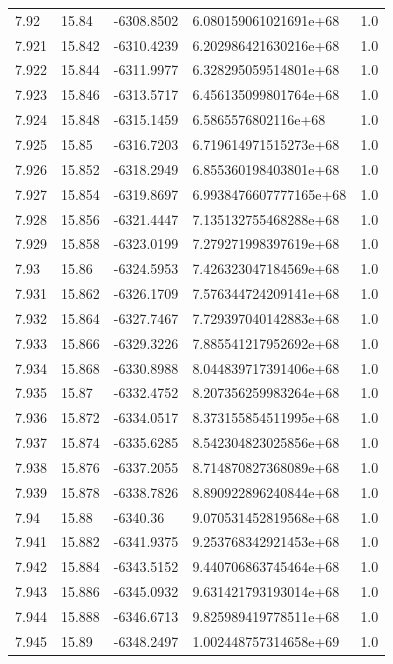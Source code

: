 \begin{tabular}{lllll}
7.92 & 15.84 & -6308.8502 & 6.080159061021691e+68 & 1.0 \\
7.921 & 15.842 & -6310.4239 & 6.202986421630216e+68 & 1.0 \\
7.922 & 15.844 & -6311.9977 & 6.328295059514801e+68 & 1.0 \\
7.923 & 15.846 & -6313.5717 & 6.456135099801764e+68 & 1.0 \\
7.924 & 15.848 & -6315.1459 & 6.5865576802116e+68 & 1.0 \\
7.925 & 15.85 & -6316.7203 & 6.719614971515273e+68 & 1.0 \\
7.926 & 15.852 & -6318.2949 & 6.855360198403801e+68 & 1.0 \\
7.927 & 15.854 & -6319.8697 & 6.9938476607777165e+68 & 1.0 \\
7.928 & 15.856 & -6321.4447 & 7.135132755468288e+68 & 1.0 \\
7.929 & 15.858 & -6323.0199 & 7.279271998397619e+68 & 1.0 \\
7.93 & 15.86 & -6324.5953 & 7.426323047184569e+68 & 1.0 \\
7.931 & 15.862 & -6326.1709 & 7.576344724209141e+68 & 1.0 \\
7.932 & 15.864 & -6327.7467 & 7.729397040142883e+68 & 1.0 \\
7.933 & 15.866 & -6329.3226 & 7.885541217952692e+68 & 1.0 \\
7.934 & 15.868 & -6330.8988 & 8.044839717391406e+68 & 1.0 \\
7.935 & 15.87 & -6332.4752 & 8.207356259983264e+68 & 1.0 \\
7.936 & 15.872 & -6334.0517 & 8.373155854511995e+68 & 1.0 \\
7.937 & 15.874 & -6335.6285 & 8.542304823025856e+68 & 1.0 \\
7.938 & 15.876 & -6337.2055 & 8.714870827368089e+68 & 1.0 \\
7.939 & 15.878 & -6338.7826 & 8.890922896240844e+68 & 1.0 \\
7.94 & 15.88 & -6340.36 & 9.070531452819568e+68 & 1.0 \\
7.941 & 15.882 & -6341.9375 & 9.253768342921453e+68 & 1.0 \\
7.942 & 15.884 & -6343.5152 & 9.440706863745464e+68 & 1.0 \\
7.943 & 15.886 & -6345.0932 & 9.631421793193014e+68 & 1.0 \\
7.944 & 15.888 & -6346.6713 & 9.825989419778511e+68 & 1.0 \\
7.945 & 15.89 & -6348.2497 & 1.002448757314658e+69 & 1.0 \\

\end{tabular}
